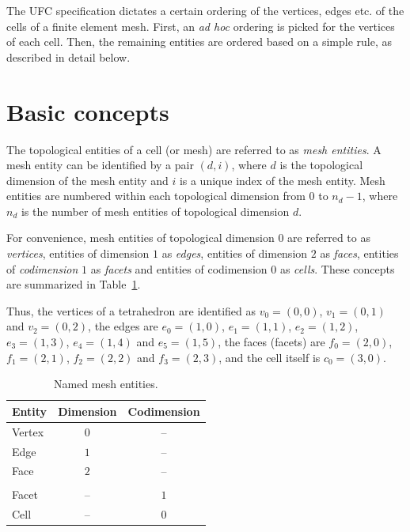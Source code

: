 The UFC specification dictates a certain ordering of the vertices,
edges etc. of the cells of a finite element mesh. First, an \emph{ad
hoc} ordering is picked for the vertices of each cell. Then, the
remaining entities are ordered based on a simple rule, as described in
detail below.

\section{Basic concepts}

The topological entities of a cell (or mesh) are referred to as
\emph{mesh entities}. A mesh entity can be identified by a pair
$(d, i)$, where $d$ is the topological dimension of the mesh entity and $i$
is a unique index of the mesh entity. Mesh entities are numbered
within each topological dimension from $0$ to $n_d-1$, where $n_d$ is
the number of mesh entities of topological dimension $d$.

For convenience, mesh entities of topological dimension $0$ are
referred to as \emph{vertices}, entities of dimension $1$
as \emph{edges}, entities of dimension $2$ as \emph{faces}, entities of
\emph{codimension} $1$ as \emph{facets} and entities of codimension
$0$ as \emph{cells}. These concepts are summarized in
Table~\ref{tab:entities}.

Thus, the vertices of a tetrahedron are identified as
$v_0 = (0, 0)$, $v_1 = (0, 1)$ and $v_2 = (0, 2)$,
the edges are
$e_0 = (1, 0)$, $e_1 = (1, 1)$, $e_2 = (1, 2)$,
$e_3 = (1, 3)$, $e_4 = (1, 4)$ and $e_5 = (1, 5)$,
the faces (facets) are
$f_0 = (2, 0)$, $f_1 = (2, 1)$, $f_2 = (2, 2)$ and $f_3 = (2, 3)$,
and the cell itself is
$c_0 = (3, 0)$.

\begin{table}[H]
\linespread{1.2}\selectfont
  \begin{center}
    \begin{tabular}{|l|c|c|}
      \hline
      Entity & Dimension & Codimension \\
      \hline
      Vertex & $0$       & -- \\
      Edge   & $1$       & -- \\
      Face   & $2$       & -- \\
      & & \\
      Facet  & --      &  $1$ \\
      Cell   & --      &  $0$ \\
      \hline
    \end{tabular}
    \caption{Named mesh entities.}
    \label{tab:entities}
  \end{center}
\end{table}

